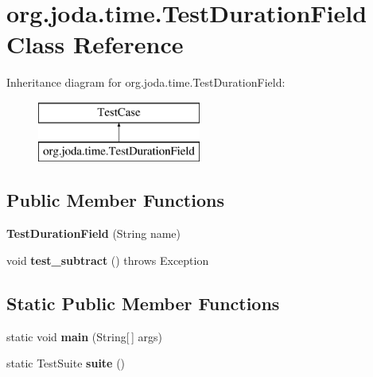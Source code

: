 \hypertarget{classorg_1_1joda_1_1time_1_1_test_duration_field}{\section{org.\-joda.\-time.\-Test\-Duration\-Field Class Reference}
\label{classorg_1_1joda_1_1time_1_1_test_duration_field}
}
Inheritance diagram for org.\-joda.\-time.\-Test\-Duration\-Field\-:\begin{figure}[H]
\begin{center}
\leavevmode
\includegraphics[height=2.000000cm]{classorg_1_1joda_1_1time_1_1_test_duration_field}
\end{center}
\end{figure}
\subsection*{Public Member Functions}
\begin{DoxyCompactItemize}
\item 
\hypertarget{classorg_1_1joda_1_1time_1_1_test_duration_field_a7440d7109a63ee79a57a56517adf989a}{{\bfseries Test\-Duration\-Field} (String name)}\label{classorg_1_1joda_1_1time_1_1_test_duration_field_a7440d7109a63ee79a57a56517adf989a}

\item 
\hypertarget{classorg_1_1joda_1_1time_1_1_test_duration_field_adf239f0655710416cfc213e2128049a7}{void {\bfseries test\-\_\-subtract} ()  throws Exception }\label{classorg_1_1joda_1_1time_1_1_test_duration_field_adf239f0655710416cfc213e2128049a7}

\end{DoxyCompactItemize}
\subsection*{Static Public Member Functions}
\begin{DoxyCompactItemize}
\item 
\hypertarget{classorg_1_1joda_1_1time_1_1_test_duration_field_a142bd76b780b12baae7589a062f4ba57}{static void {\bfseries main} (String\mbox{[}$\,$\mbox{]} args)}\label{classorg_1_1joda_1_1time_1_1_test_duration_field_a142bd76b780b12baae7589a062f4ba57}

\item 
\hypertarget{classorg_1_1joda_1_1time_1_1_test_duration_field_a96c6ccbc1ad746061012df23a62f6018}{static Test\-Suite {\bfseries suite} ()}\label{classorg_1_1joda_1_1time_1_1_test_duration_field_a96c6ccbc1ad746061012df23a62f6018}

\end{DoxyCompactItemize}
